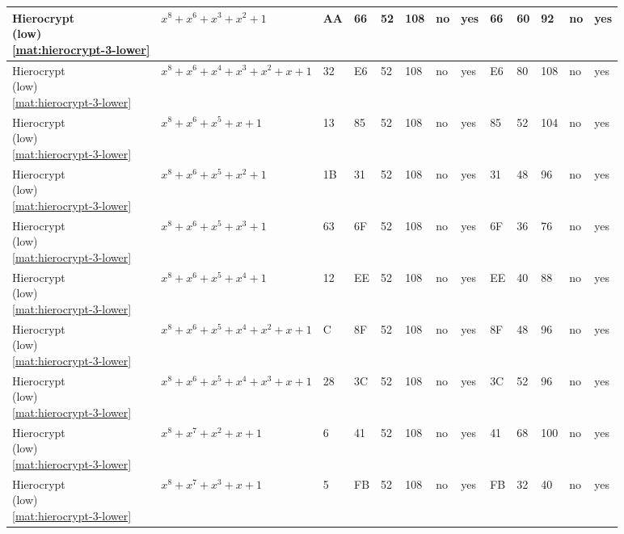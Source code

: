 \begin{tiny}
\begin{longtable}{|l|l|l|l|l|l|l|l|l|l|l|l|l|}
\shortstack{Hierocrypt \\ (low) \\ \eqref{mat:hierocrypt-3-lower}} & $x^8 + x^6 + x^3 + x^2 + 1$ & AA & 66 & 52 & 108 & no & yes & 66 & 60 & 92 & no & yes \\ \hline
\shortstack{Hierocrypt \\ (low) \\ \eqref{mat:hierocrypt-3-lower}} & $x^8 + x^6 + x^4 + x^3 + x^2 + x + 1$ & 32 & E6 & 52 & 108 & no & yes & E6 & 80 & 108 & no & yes \\ \hline
\shortstack{Hierocrypt \\ (low) \\ \eqref{mat:hierocrypt-3-lower}} & $x^8 + x^6 + x^5 + x + 1$ & 13 & 85 & 52 & 108 & no & yes & 85 & 52 & 104 & no & yes \\ \hline
\shortstack{Hierocrypt \\ (low) \\ \eqref{mat:hierocrypt-3-lower}} & $x^8 + x^6 + x^5 + x^2 + 1$ & 1B & 31 & 52 & 108 & no & yes & 31 & 48 & 96 & no & yes \\ \hline
\shortstack{Hierocrypt \\ (low) \\ \eqref{mat:hierocrypt-3-lower}} & $x^8 + x^6 + x^5 + x^3 + 1$ & 63 & 6F & 52 & 108 & no & yes & 6F & 36 & 76 & no & yes \\ \hline
\shortstack{Hierocrypt \\ (low) \\ \eqref{mat:hierocrypt-3-lower}} & $x^8 + x^6 + x^5 + x^4 + 1$ & 12 & EE & 52 & 108 & no & yes & EE & 40 & 88 & no & yes \\ \hline
\shortstack{Hierocrypt \\ (low) \\ \eqref{mat:hierocrypt-3-lower}} & $x^8 + x^6 + x^5 + x^4 + x^2 + x + 1$ & C & 8F & 52 & 108 & no & yes & 8F & 48 & 96 & no & yes \\ \hline
\shortstack{Hierocrypt \\ (low) \\ \eqref{mat:hierocrypt-3-lower}} & $x^8 + x^6 + x^5 + x^4 + x^3 + x + 1$ & 28 & 3C & 52 & 108 & no & yes & 3C & 52 & 96 & no & yes \\ \hline
\shortstack{Hierocrypt \\ (low) \\ \eqref{mat:hierocrypt-3-lower}} & $x^8 + x^7 + x^2 + x + 1$ & 6 & 41 & 52 & 108 & no & yes & 41 & 68 & 100 & no & yes \\ \hline
\shortstack{Hierocrypt \\ (low) \\ \eqref{mat:hierocrypt-3-lower}} & $x^8 + x^7 + x^3 + x + 1$ & 5 & FB & 52 & 108 & no & yes & FB & 32 & 40 & no & yes \\ \hline

\end{longtable}
\end{tiny}
